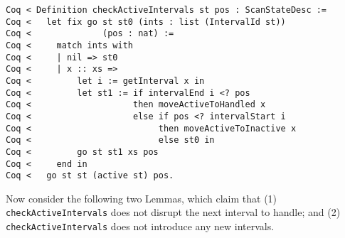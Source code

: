 \documentclass{llncs}
\begin{document}
\begin{flushleft}
\texttt{Coq~{<}~Definition~checkActiveIntervals~st~pos~:~ScanStateDesc~:=}\\
\texttt{Coq~{<}~~~let~fix~go~st~st0~(ints~:~list~(IntervalId~st))}\\
\texttt{Coq~{<}~~~~~~~~~~~~~~(pos~:~nat)~:=}\\
\texttt{Coq~{<}~~~~~match~ints~with}\\
\texttt{Coq~{<}~~~~~|~nil~={>}~st0}\\
\texttt{Coq~{<}~~~~~|~x~::~xs~={>}}\\
\texttt{Coq~{<}~~~~~~~~~let~i~:=~getInterval~x~in}\\
\texttt{Coq~{<}~~~~~~~~~let~st1~:=~if~intervalEnd~i~{<}?~pos}\\
\texttt{Coq~{<}~~~~~~~~~~~~~~~~~~~~then~moveActiveToHandled~x}\\
\texttt{Coq~{<}~~~~~~~~~~~~~~~~~~~~else~if~pos~{<}?~intervalStart~i}\\
\texttt{Coq~{<}~~~~~~~~~~~~~~~~~~~~~~~~~then~moveActiveToInactive~x}\\
\texttt{Coq~{<}~~~~~~~~~~~~~~~~~~~~~~~~~else~st0~in}\\
\texttt{Coq~{<}~~~~~~~~~go~st~st1~xs~pos}\\
\texttt{Coq~{<}~~~~~end~in}\\
\texttt{Coq~{<}~~~go~st~st~(active~st)~pos.}\\
\end{flushleft}




Now consider the following two Lemmas, which claim that (1)
\texttt{checkActiveIntervals} does not disrupt the next interval to handle;
and (2) \texttt{checkActiveIntervals} does not introduce any new intervals.
\end{document}
